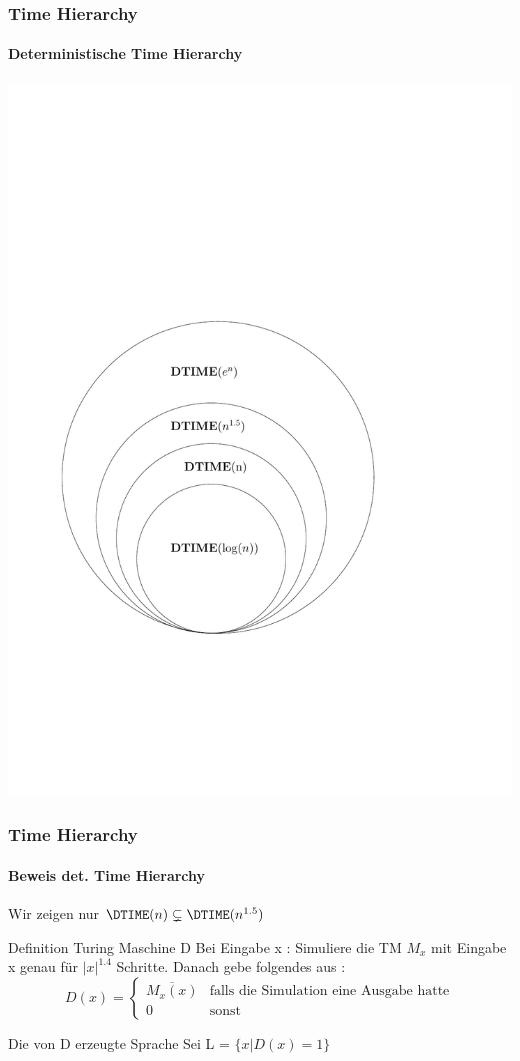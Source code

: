 \begin{frame}
	\frametitle{Time Hierarchy}
	\framesubtitle{Deterministische Time Hierarchy}
	\includegraphics[scale=0.5]{images/timehierarchy.pdf}
\end{frame}

\begin{frame}
	\frametitle{Time Hierarchy}
	\framesubtitle{{Beweis det. Time Hierarchy}}
	Wir zeigen nur $\DTIME(n) \subsetneq \DTIME(n^{1.5})$
	\bigskip
	\pause
	\begin{KITblock}{Definition Turing Maschine D} 
		Bei Eingabe x : Simuliere die TM $M_x$ mit Eingabe x genau für $|x|^{1.4}$ 						Schritte. Danach gebe folgendes aus :
		\begin{equation}
		D(x) = 
		\begin{cases}
			\overline{M_x(x)} & \text{falls die Simulation eine Ausgabe hatte} \\
			0 & \text{sonst}
			
		\end{cases}
		\end{equation}			
	\end{KITblock}
	\bigskip
	\pause	
	
	\begin{KITblock}{Die von D erzeugte Sprache}
		Sei L = $ \lbrace x \vert D(x) = 1  \rbrace$
	\end{KITblock}
\end{frame}

